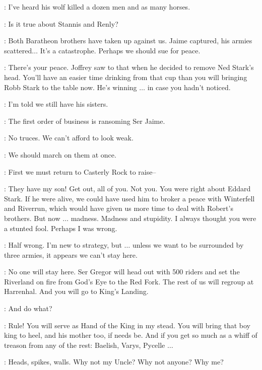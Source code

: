 \FIRSTLANNISTER: I've heard his wolf killed a dozen men and as many horses. 

\SECONDLANNISTER: Is it true about Stannis and Renly? 

\KEVAN: Both Baratheon brothers have taken up against us. Jaime captured, his armies scattered$\ldots$ It's a catastrophe. Perhaps we should sue for peace. 


\TYRION: There's your peace. Joffrey saw to that when he decided to remove Ned Stark's head. You'll have an easier time drinking from that cup than you will bringing Robb Stark to the table now. He's winning $\ldots$ in case you hadn't noticed. 

\KEVAN: I'm told we still have his sisters. 

\FIRSTLANNISTER: The first order of business is ransoming Ser Jaime. 

\SECONDLANNISTER: No truces. We can't afford to look weak. 

\FIRSTLANNISTER: We should march on them at once. 

\SECONDLANNISTER: First we must return to Casterly Rock to raise-- 

\TYWIN: They have my son! Get out, all of you.  Not you. You were right about Eddard Stark. If he were alive, we could have used him to broker a peace with Winterfell and Riverrun, which would have given us more time to deal with Robert's brothers. But now $\ldots$ madness. Madness and stupidity. I always thought you were a stunted fool. Perhaps I was wrong. 

\TYRION: Half wrong. I'm new to strategy, but $\ldots$ unless we want to be surrounded by three armies, it appears we can't stay here. 

\TYWIN: No one will stay here. Ser Gregor will head out with 500 riders and set the Riverland on fire from God's Eye to the Red Fork. The rest of us will regroup at Harrenhal. And you will go to King's Landing. 

\TYRION: And do what? 

\TYWIN: Rule! You will serve as Hand of the King in my stead. You will bring that boy king to heel, and his mother too, if needs be. And if you get so much as a whiff of treason from any of the rest: Baelish, Varys, Pycelle $\ldots$  

\TYRION: Heads, spikes, walls. Why not my Uncle? Why not anyone? Why me? 

